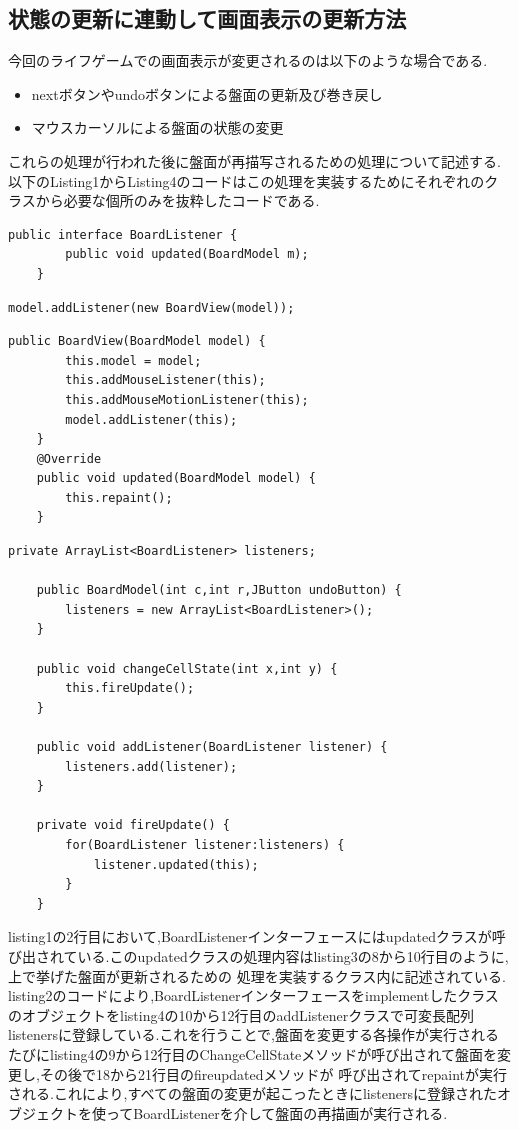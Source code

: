 \documentclass[dvipdfmx]{jarticle}
\begin{document}
\subsection{状態の更新に連動して画面表示の更新方法}
今回のライフゲームでの画面表示が変更されるのは以下のような場合である.
\begin{itemize}
    \item nextボタンやundoボタンによる盤面の更新及び巻き戻し
    \item マウスカーソルによる盤面の状態の変更
\end{itemize}
これらの処理が行われた後に盤面が再描写されるための処理について記述する.\\
以下のListing1からListing4のコードはこの処理を実装するためにそれぞれのクラスから必要な個所のみを抜粋したコードである.
\begin{lstlisting}[caption=BoardListenerインターフェース,label=fuga]
    public interface BoardListener {
	    public void updated(BoardModel m);
    }
\end{lstlisting}
\begin{lstlisting}[caption=Mainクラス,label=fuga]
    model.addListener(new BoardView(model));
\end{lstlisting}
\begin{lstlisting}[caption=BoardViewクラス,label=fuga]
    public BoardView(BoardModel model) {
		this.model = model;
		this.addMouseListener(this);
		this.addMouseMotionListener(this);
		model.addListener(this);
	}
    @Override
	public void updated(BoardModel model) {
		this.repaint();
	}
\end{lstlisting}
\begin{lstlisting}[caption=BoardModelクラス,label=fuga]
    private ArrayList<BoardListener> listeners;

    public BoardModel(int c,int r,JButton undoButton) {
		listeners = new ArrayList<BoardListener>();
	}

    public void changeCellState(int x,int y) {
		this.fireUpdate();
	}

    public void addListener(BoardListener listener) {
		listeners.add(listener);
	}
	
	private void fireUpdate() {
		for(BoardListener listener:listeners) {
			listener.updated(this);
		}
	}
\end{lstlisting}
listing1の2行目において,BoardListenerインターフェースにはupdatedクラスが呼び出されている.このupdatedクラスの処理内容はlisting3の8から10行目のように,上で挙げた盤面が更新されるための
処理を実装するクラス内に記述されている.
listing2のコードにより,BoardListenerインターフェースをimplementしたクラスのオブジェクトをlisting4の10から12行目のaddListenerクラスで可変長配列
listenersに登録している.これを行うことで,盤面を変更する各操作が実行されるたびにlisting4の9から12行目のChangeCellStateメソッドが呼び出されて盤面を変更し,その後で18から21行目のfireupdatedメソッドが
呼び出されてrepaintが実行される.これにより,すべての盤面の変更が起こったときにlistenersに登録されたオブジェクトを使ってBoardListenerを介して盤面の再描画が実行される.
\end{document}
